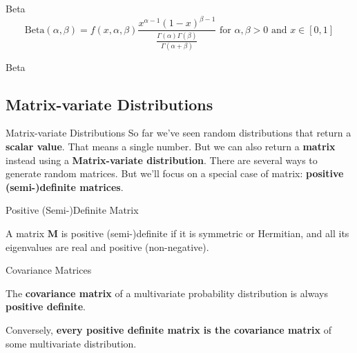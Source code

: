 \begin{frame}[noframenumbering]{Beta}
	$$\text{Beta} (\alpha, \beta) = f(x, \alpha, \beta) \frac{x^{\alpha-1}(1-x)^{\beta-1}} {\frac{\Gamma (\alpha )\Gamma (\beta )}{\Gamma (\alpha +\beta )}} \text{ for $\alpha,\beta > 0$ and $x \in [0, 1]$}$$
\end{frame}

\begin{frame}[noframenumbering]{Beta}
	\centering
\end{frame}

\subsection*{Matrix-variate Distributions}
\begin{frame}[noframenumbering]{Matrix-variate Distributions}
	So far we've seen random distributions that return a \textbf{scalar value}.
	That means a single number.
	\vfill
	But we can also return a \textbf{matrix} instead using a \textbf{Matrix-variate distribution}.
	\vfill
	There are several ways to generate random matrices.
	But we'll focus on a special case of matrix: \textbf{positive (semi-)definite matrices}.
\end{frame}

\begin{frame}[noframenumbering]{Positive (Semi-)Definite Matrix}
	\begin{defn}
		A matrix $\mathbf{M}$ is positive (semi-)definite if it is symmetric or Hermitian, and all its eigenvalues are real and positive (non-negative).
	\end{defn}
\end{frame}

\begin{frame}[noframenumbering]{Covariance Matrices}
	\begin{example}
		The \textbf{covariance matrix} of a multivariate probability distribution is always \textbf{positive definite}.

		\vspace{0.5cm}

		Conversely, \textbf{every positive definite matrix is the covariance matrix} of some multivariate distribution.
	\end{example}
\end{frame}

